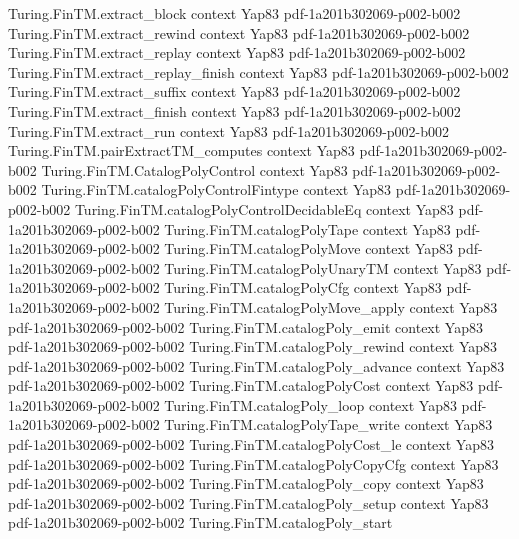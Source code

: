 \begin{theorem}
  {Turing.FinTM.extract_block}
  {context}
  {Yap83}
  {pdf-1a201b302069-p002-b002}
\proofstep
  {Turing.FinTM.extract_rewind}
  {context}
  {Yap83}
  {pdf-1a201b302069-p002-b002}
\proofstep
  {Turing.FinTM.extract_replay}
  {context}
  {Yap83}
  {pdf-1a201b302069-p002-b002}
\proofstep
  {Turing.FinTM.extract_replay_finish}
  {context}
  {Yap83}
  {pdf-1a201b302069-p002-b002}
\proofstep
  {Turing.FinTM.extract_suffix}
  {context}
  {Yap83}
  {pdf-1a201b302069-p002-b002}
\proofstep
  {Turing.FinTM.extract_finish}
  {context}
  {Yap83}
  {pdf-1a201b302069-p002-b002}
\proofstep
  {Turing.FinTM.extract_run}
  {context}
  {Yap83}
  {pdf-1a201b302069-p002-b002}
\proofstep
  {Turing.FinTM.pairExtractTM_computes}
  {context}
  {Yap83}
  {pdf-1a201b302069-p002-b002}
\proofstep
  {Turing.FinTM.CatalogPolyControl}
  {context}
  {Yap83}
  {pdf-1a201b302069-p002-b002}
\proofstep
  {Turing.FinTM.catalogPolyControlFintype}
  {context}
  {Yap83}
  {pdf-1a201b302069-p002-b002}
\proofstep
  {Turing.FinTM.catalogPolyControlDecidableEq}
  {context}
  {Yap83}
  {pdf-1a201b302069-p002-b002}
\proofstep
  {Turing.FinTM.catalogPolyTape}
  {context}
  {Yap83}
  {pdf-1a201b302069-p002-b002}
\proofstep
  {Turing.FinTM.catalogPolyMove}
  {context}
  {Yap83}
  {pdf-1a201b302069-p002-b002}
\proofstep
  {Turing.FinTM.catalogPolyUnaryTM}
  {context}
  {Yap83}
  {pdf-1a201b302069-p002-b002}
\proofstep
  {Turing.FinTM.catalogPolyCfg}
  {context}
  {Yap83}
  {pdf-1a201b302069-p002-b002}
\proofstep
  {Turing.FinTM.catalogPolyMove_apply}
  {context}
  {Yap83}
  {pdf-1a201b302069-p002-b002}
\proofstep
  {Turing.FinTM.catalogPoly_emit}
  {context}
  {Yap83}
  {pdf-1a201b302069-p002-b002}
\proofstep
  {Turing.FinTM.catalogPoly_rewind}
  {context}
  {Yap83}
  {pdf-1a201b302069-p002-b002}
\proofstep
  {Turing.FinTM.catalogPoly_advance}
  {context}
  {Yap83}
  {pdf-1a201b302069-p002-b002}
\proofstep
  {Turing.FinTM.catalogPolyCost}
  {context}
  {Yap83}
  {pdf-1a201b302069-p002-b002}
\proofstep
  {Turing.FinTM.catalogPoly_loop}
  {context}
  {Yap83}
  {pdf-1a201b302069-p002-b002}
\proofstep
  {Turing.FinTM.catalogPolyTape_write}
  {context}
  {Yap83}
  {pdf-1a201b302069-p002-b002}
\proofstep
  {Turing.FinTM.catalogPolyCost_le}
  {context}
  {Yap83}
  {pdf-1a201b302069-p002-b002}
\proofstep
  {Turing.FinTM.catalogPolyCopyCfg}
  {context}
  {Yap83}
  {pdf-1a201b302069-p002-b002}
\proofstep
  {Turing.FinTM.catalogPoly_copy}
  {context}
  {Yap83}
  {pdf-1a201b302069-p002-b002}
\proofstep
  {Turing.FinTM.catalogPoly_setup}
  {context}
  {Yap83}
  {pdf-1a201b302069-p002-b002}
\proofstep
  {Turing.FinTM.catalogPoly_start}

\end{theorem}
